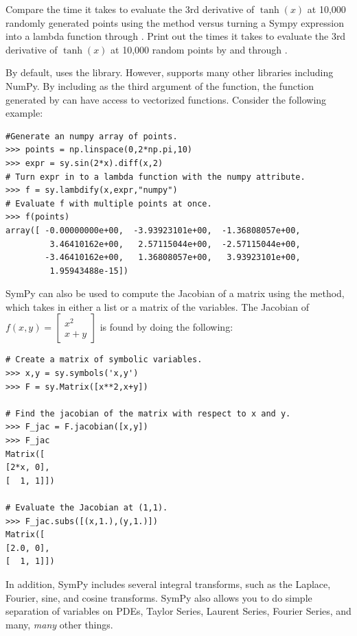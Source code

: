 \begin{problem}
Compare the time it takes to evaluate the 3rd derivative of $\tanh\left(x\right)$ at 10,000 randomly generated points using the  method versus turning a Sympy expression into a lambda function through .
Print out the times it takes to evaluate the 3rd derivative of $\tanh\left(x\right)$ at 10,000 random points by  and through .
\end{problem}

By default,  uses the  library. However,  supports many other libraries including NumPy. By including  as the third argument of the function, the function generated by  can have access to vectorized functions.
Consider the following example:
\begin{lstlisting}
#Generate an numpy array of points.
>>> points = np.linspace(0,2*np.pi,10)
>>> expr = sy.sin(2*x).diff(x,2)
# Turn expr in to a lambda function with the numpy attribute.
>>> f = sy.lambdify(x,expr,"numpy")
# Evaluate f with multiple points at once.
>>> f(points)
array([ -0.00000000e+00,  -3.93923101e+00,  -1.36808057e+00,
         3.46410162e+00,   2.57115044e+00,  -2.57115044e+00,
        -3.46410162e+00,   1.36808057e+00,   3.93923101e+00,
         1.95943488e-15])
\end{lstlisting}

SymPy can also be used to compute the Jacobian of a matrix using the  method, which takes in either a list or a matrix of the variables.  The Jacobian of $f(x,y) = \left[\begin{array}{c} x^2 \\ x+y \end{array}\right]$ is found by doing the following:
\begin{lstlisting}
# Create a matrix of symbolic variables.
>>> x,y = sy.symbols('x,y')
>>> F = sy.Matrix([x**2,x+y])

# Find the jacobian of the matrix with respect to x and y.
>>> F_jac = F.jacobian([x,y])
>>> F_jac
Matrix([
[2*x, 0],
[  1, 1]])

# Evaluate the Jacobian at (1,1).
>>> F_jac.subs([(x,1.),(y,1.)])
Matrix([
[2.0, 0],
[  1, 1]])

\end{lstlisting}

In addition, SymPy includes several integral transforms, such as the Laplace, Fourier, sine, and cosine transforms.
SymPy also allows you to do simple separation of variables on PDEs, Taylor Series, Laurent Series, Fourier Series, and many, \textit{many} other things.

